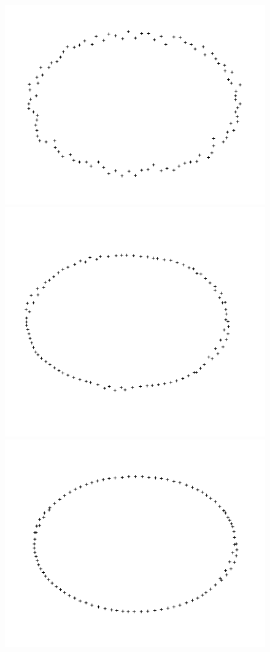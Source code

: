 \documentclass{beamer}
\begin{document}
\begin{frame}[allowframebreaks]
    \begin{figure}
        \centering
        \includegraphics[scale=0.18]{img/ellipse-perimeter-sparse-0}
        \includegraphics[scale=0.18]{img/ellipse-perimeter-sparse-10}
        \includegraphics[scale=0.18]{img/ellipse-perimeter-sparse-50}

\end{figure}
\end{frame}
\end{document}
